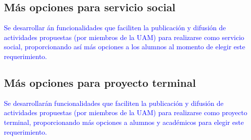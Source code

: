 \documentclass[11pt,letterpaper,titlepage]{article}
\begin{document}



\subsection{M\'as opciones para servicio social}
\textcolor{blue}{
Se desarrollar \'an funcionalidades que faciliten la publicaci\'on y difusi\'on de actividades propuestas (por miembros de la UAM) para realizarse como servicio social, proporcionando as\'i m\'as opciones a los alumnos al momento de elegir este requerimiento.}

\subsection{M\'as opciones para proyecto terminal}
\textcolor{blue}{
Se desarrollar\'an funcionalidades que faciliten la publicaci\'on y difusi\'on de actividades propuestas (por miembros de la UAM) para realizarse como proyecto terminal, proporcionando m\'as opciones a alumnos y acad\'emicos para elegir este requerimiento.}
\end{document}
